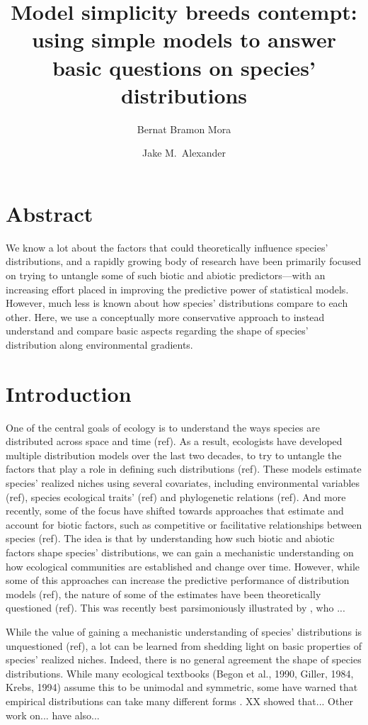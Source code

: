 \documentclass[11pt, a4paper]{article}
\title{\vspace{-1cm}
Model simplicity breeds contempt: using simple models to answer basic questions on species' distributions}
\author[1,*]{\normalsize Bernat Bramon Mora}
\author[1]{\normalsize Jake M.\ Alexander}
\affil[1]{\footnotesize Institute of Integrative Biology, ETH Zürich, Zürich, Switzerland}
\affil[*]{\footnotesize  bernat.bramon@gmail.com}
\date{}
\begin{document}
\maketitle
\linenumbers

\section*{Abstract}
We know a lot about the factors that could theoretically influence species' distributions, and a rapidly growing body of research have been primarily focused on trying to untangle some of such biotic and abiotic predictors---with an increasing effort placed in improving the predictive power of statistical models. However, much less is known about how species' distributions compare to each other. Here, we use a conceptually more conservative approach to instead understand and compare basic aspects regarding the shape of species' distribution along environmental gradients.

\section*{Introduction}


One of the central goals of ecology is to understand the ways species are distributed across space and time (ref). As a result, ecologists have developed multiple distribution models over the last two decades, to try to untangle the factors that play a role in defining such distributions (ref). These models estimate species' realized niches using several covariates, including environmental variables (ref), species ecological traits' (ref) and phylogenetic relations (ref). And more recently, some of the focus have shifted towards approaches that estimate and account for biotic factors, such as competitive or facilitative relationships between species (ref). The idea is that by understanding how such biotic and abiotic factors shape species' distributions, we can gain a mechanistic understanding on how ecological communities are established and change over time. However, while some of this approaches can increase the predictive performance of distribution models (ref), the nature of some of the estimates have been theoretically questioned (ref). This was recently best parsimoniously illustrated by \citealt{bla bla}, who ...

While the value of gaining a mechanistic understanding of species' distributions is unquestioned (ref), a lot can be learned from shedding light on basic properties of species' realized niches. Indeed, there is no general agreement the shape of species distributions. While many ecological textbooks (Begon et al., 1990, Giller, 1984, Krebs, 1994) assume this to be unimodal and symmetric, some have warned that empirical distributions can take many different forms \citep{austin2002spatial}. XX showed that... Other work on... have also... 
\end{document}
